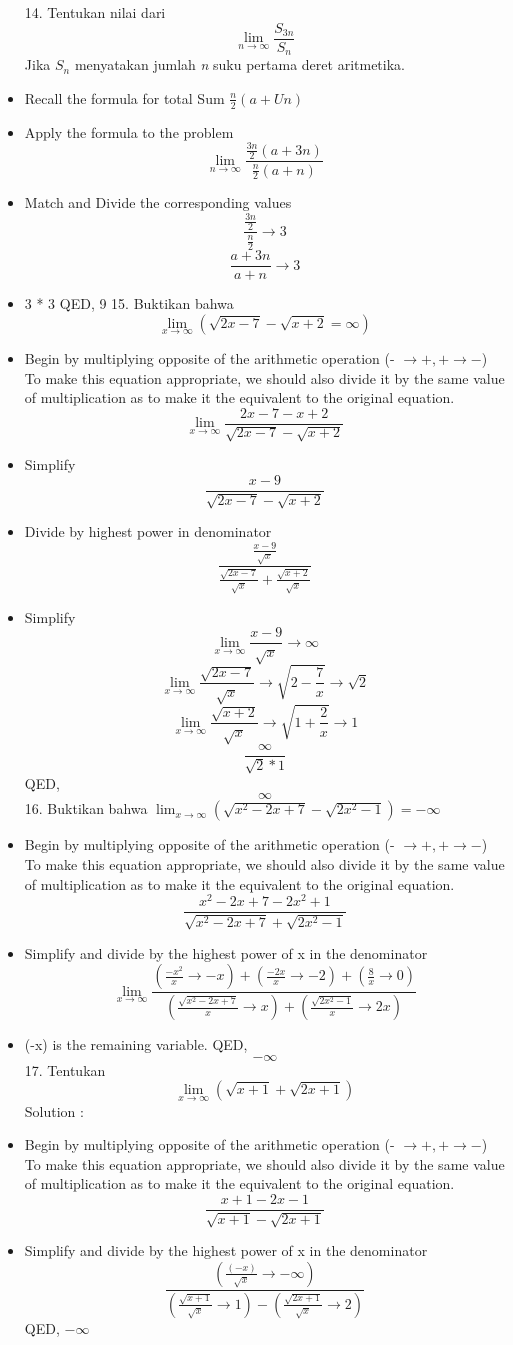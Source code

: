 \documentclass{article}
\begin{document}
\begin{itemize}
14. Tentukan nilai dari $$\displaystyle \lim_{n\to\infty}\frac{S_{3n}}{S_n}$$ Jika $S_n$ menyatakan jumlah \textit{n} suku pertama deret aritmetika. 
\item Recall the formula for total Sum $\frac{n}{2}(a+Un)$
\item Apply the formula to the problem
$$\displaystyle \lim_{n\to\infty}\frac{\frac{3n}{2}(a+3n)}{\frac{n}{2}(a+n)}$$
\item Match and Divide the corresponding values
$$\frac{\frac{3n}{2}}{\frac{n}{2}}\to3$$
$$\frac{a+3n}{a+n}\to3$$
\item 3 * 3 
QED, 9
15. Buktikan bahwa $$\displaystyle \lim_{x\to\infty}\left(\sqrt{2x-7}-\sqrt{x+2}=\infty\right)$$
\item Begin by multiplying opposite of the arithmetic operation (- $\to +, + \to -$) To make this equation appropriate, we should also divide it by the same value of multiplication as to make it the equivalent to the original equation.
$$\displaystyle \lim_{x\to\infty}\frac{2x-7-x+2}{\sqrt{2x-7}-\sqrt{x+2}}$$
\item Simplify 
$$\frac{x-9}{\sqrt{2x-7}-\sqrt{x+2}}$$
\item Divide by highest power in denominator
$$\frac{\frac{x-9}{\sqrt{x}}}{\frac{\sqrt{2x-7}}{\sqrt{x}}+\frac{\sqrt{x+2}}{\sqrt{x}}}$$
\item Simplify 
$$\displaystyle \lim_{x\to\infty}\frac{x-9}{\sqrt{x}}\to \infty$$
$$\displaystyle \lim_{x\to\infty}\frac{\sqrt{2x-7}}{\sqrt{x}}\to \sqrt{2 -\frac{7}{x}}\to \sqrt{2}$$
$$\displaystyle \lim_{x\to\infty}\frac{\sqrt{x+2}}{\sqrt{x}}\to \sqrt{1+\frac{2}{x}}\to 1$$
$$\frac{\infty}{\sqrt{2}*{1}}$$
QED, $$\infty$$
16. Buktikan bahwa $\displaystyle \lim_{x\to\infty}\left(\sqrt{x^2-2x+7}-\sqrt{2x^2-1}\right)=-\infty$
\item Begin by multiplying opposite of the arithmetic operation (- $\to +, + \to -$) To make this equation appropriate, we should also divide it by the same value of multiplication as to make it the equivalent to the original equation.
$$\frac{x^2-2x+7-2x^2+1}{\sqrt{x^2-2x+7}+\sqrt{2x^2-1}}$$
\item Simplify and divide by the highest power of x in the denominator 
$$\displaystyle \lim_{x\to\infty}\frac{(\frac{-x^2}{x}\to -x)+(\frac{-2x}{x}\to -2)+(\frac{8}{x}\to 0)}{(\frac{\sqrt{x^2-2x+7}}{x}\to x)+(\frac{\sqrt{2x^2-1}}{x}\to2x)}$$
\item (-x) is the remaining variable.
QED, $$-\infty$$
17. Tentukan $$\displaystyle \lim_{x\to\infty}(\sqrt{x+1}+\sqrt{2x+1})$$
Solution :
\item Begin by multiplying opposite of the arithmetic operation (- $\to +, + \to -$) To make this equation appropriate, we should also divide it by the same value of multiplication as to make it the equivalent to the original equation.
$$\frac{x+1-2x-1}{\sqrt{x+1}-\sqrt{2x+1}}$$
\item Simplify and divide by the highest power of x in the denominator
$$\frac{(\frac{(-x)}{\sqrt{x}}\to -\infty)}{(\frac{\sqrt{x+1}}{\sqrt{x}}\to 1)-(\frac{\sqrt{2x+1}}{\sqrt{x}}\to 2)}$$
QED, $-\infty$
\end{itemize}
\end{document}
